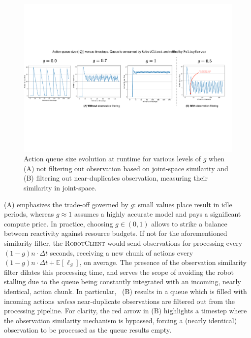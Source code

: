 \begin{figure}
    \centering
    \begin{minipage}[t]{0.99\textwidth}
        \centering
        \includegraphics[width=\textwidth]{figures/queues.pdf}
        \caption{Action queue size evolution at runtime for various levels of \( g\) when (A) not filtering out observation based on joint-space similarity and (B) filtering out near-duplicates observation, measuring their similarity in joint-space.}
        \label{fig:queues}
    \end{minipage}
\end{figure}

(A) emphasizes the trade-off governed by \(g\): small values place result in idle periods, whereas \(g\approx 1\) assumes a highly accurate model and pays a significant compute price. In practice, choosing \(g\in(0,1)\) allows to strike a balance between reactivity against resource budgets. 
If not for the aforementioned similarity filter, the \textsc{RobotClient} would send observations for processing every \( (1 - g) n \cdot \Delta t\) seconds, receiving a new chunk of actions every \( (1 - g) n \cdot \Delta t + \mathbb E[\ell_S] \), on average. 
The presence of the observation similarity filter dilates this processing time, and serves the scope of avoiding the robot stalling due to the queue being constantly integrated with an incoming, nearly identical, action chunk. 
In particular, ~(B) results in a queue which is filled with incoming actions \emph{unless} near-duplicate observations are filtered out from the processing pipeline. For clarity, the red arrow in (B) highlights a timestep where the observation similarity mechanism is bypassed, forcing a (nearly identical) observation to be processed as the queue results empty.

